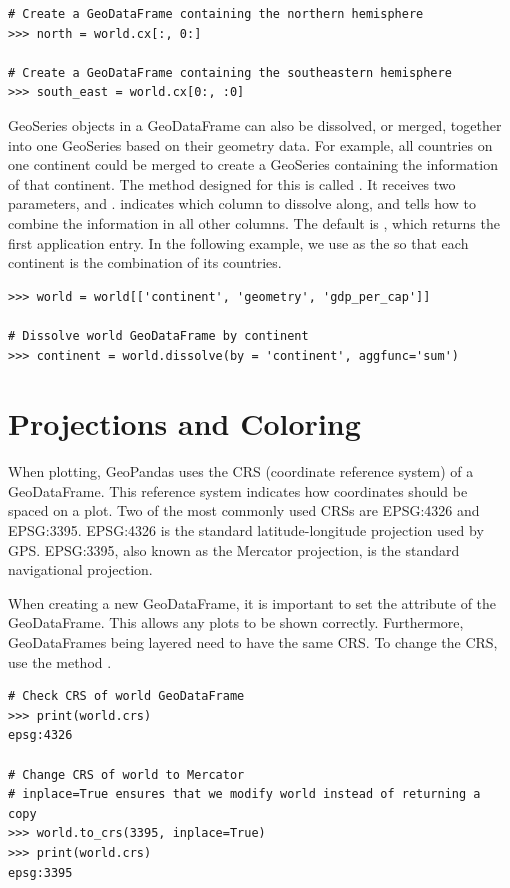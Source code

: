 \begin{lstlisting}
# Create a GeoDataFrame containing the northern hemisphere
>>> north = world.cx[:, 0:]

# Create a GeoDataFrame containing the southeastern hemisphere
>>> south_east = world.cx[0:, :0]
\end{lstlisting}

GeoSeries objects in a GeoDataFrame can also be dissolved, or merged, together into one GeoSeries based on their geometry data.
For example, all countries on one continent could be merged to create a GeoSeries containing the information of that continent.
The method designed for this is called .
It receives two parameters,  and .
 indicates which column to dissolve along, and  tells how to combine the information in all other columns.
The default  is , which returns the first application entry.
In the following example, we use  as the  so that each continent is the combination of its countries.

\begin{lstlisting}
>>> world = world[['continent', 'geometry', 'gdp_per_cap']]

# Dissolve world GeoDataFrame by continent
>>> continent = world.dissolve(by = 'continent', aggfunc='sum')
\end{lstlisting}


\section*{Projections and Coloring} %

When plotting, GeoPandas uses the CRS (coordinate reference system) of a GeoDataFrame.
This reference system indicates how coordinates should be spaced on a plot.
Two of the most commonly used CRSs are EPSG:4326 and EPSG:3395.
EPSG:4326 is the standard latitude-longitude projection used by GPS.
EPSG:3395, also known as the Mercator projection, is the standard navigational projection.

When creating a new GeoDataFrame, it is important to set the  attribute of the GeoDataFrame.
This allows any plots to be shown correctly.
Furthermore, GeoDataFrames being layered need to have the same CRS.
To change the CRS, use the method .

\begin{lstlisting}
# Check CRS of world GeoDataFrame
>>> print(world.crs)
epsg:4326

# Change CRS of world to Mercator
# inplace=True ensures that we modify world instead of returning a copy
>>> world.to_crs(3395, inplace=True)
>>> print(world.crs)
epsg:3395
\end{lstlisting}

